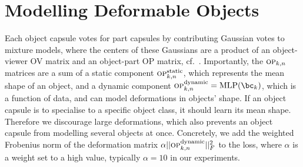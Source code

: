 \section{Modelling Deformable Objects}
\label{app:deformations}

Each object capsule votes for part capsules by contributing Gaussian votes to mixture models, where the centers of these Gaussians are a product of an object-viewer \gls{OV} matrix and an object-part \gls{OP} matrix, cf.\ .
Importantly, the  $\textsc{op}_{k,n}$ matrices  are a sum of a static component $\textsc{op}_{k,n}^\mathrm{static}$, which represents the mean shape of an object, and a dynamic component $\textsc{op}_{k,n}^\mathrm{dynamic} = \MLP(\bc_k)$, which is a function of data, and can model deformations in objects' shape.
If an object capsule is to specialise to a specific object class, it should learn its mean shape.
Therefore we discourage large deformations, which also prevents an object capsule from modelling several objects at once.
Concretely, we add the weighted Frobenius norm of the deformation matrix $\alpha||\textsc{op}_{k,n}^\mathrm{dynamic}||_F^2$ to the loss, where $\alpha$ is a weight set to a high value, typically $\alpha=10$ in our experiments.